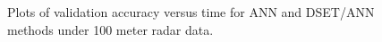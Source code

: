 \documentclass[12pt]{uthesis-v12}  %
\begin{document}
\begin{figure}
	\hfill	
{}
						
\caption{Plots of validation accuracy versus time for ANN and DSET/ANN methods under 100 meter radar data.}
	\label{100-ones}
	\end{figure}
	
\end{document}

